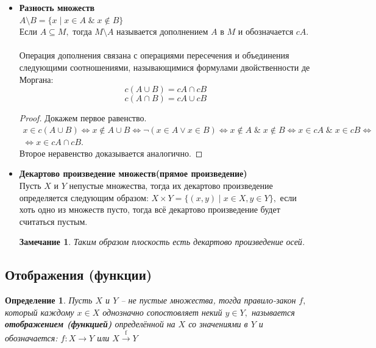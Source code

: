 \documentclass{article}
\newtheorem{Remark}{Замечание}[section]
\newtheorem{Definition}{Определение}[section]
\begin{document}
\begin{itemize}
\item {\bf Разность множеств}
\\$A\setminus B = \{x\mid x\in A \;\&\; x\notin B\}$
\\Если $A\subseteq M,$ тогда $M\setminus A$ называется дополнением $A$ в $M$ и обозначается $cA.$\\
\\Операция дополнения связана с операциями пересечения и объединения следующими соотношениями, называющимися формулами двойственности де Моргана: 
$$c\left(A\cup B\right)=cA\cap cB$$
$$c\left(A\cap B\right)=cA\cup cB$$

\begin{proof}
Докажем первое равенство. 
\begin{eqnarray}
x\in c\left(A\cup B\right) \Leftrightarrow x\notin A\cup B \Leftrightarrow \neg\left(x\in A \vee x\in B\right) \Leftrightarrow x\notin A \;\&\; x\notin B \Leftrightarrow x\in cA \;\&\; x\in cB \Leftrightarrow \nonumber \\ 
\Leftrightarrow x\in cA\cap cB.\nonumber
\end{eqnarray}
Второе неравенство доказывается аналогично.
\end{proof}

\item {\bf Декартово произведение множеств(прямое произведение)}
\\Пусть $X$ и $Y$ непустые множества, тогда их декартово произведение определяется следующим образом: $X\times Y = \{(x,y)\mid x\in X, y\in Y\},$ если хоть одно из множеств пусто, тогда всё декартово произведение будет считаться пустым.

\begin{Remark}
Таким образом плоскость есть декартово произведение осей.
\end{Remark}
\end{itemize}

\subsection{Отображения (функции)}

\begin{Definition}
Пусть $X$ и $Y$ -- не пустые множества, тогда правило-закон $f,$ который каждому $x\in X$ однозначно сопостовляет некий $y\in Y,$ называется {\bf отображением (функцией)} определённой на $X$ со значениями в $Y$ и обозначается: $f:X \rightarrow Y$ или $X \xrightarrow{\text{f}}Y$
\end{Definition}
\end{document}
